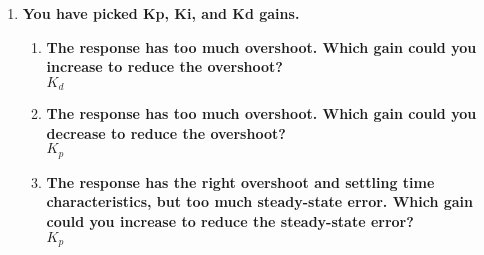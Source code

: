 \documentclass{article}
\begin{document}
\begin{enumerate}[label=\textbf{\arabic*})]
     \item \textbf{You have picked Kp, Ki, and Kd gains. } \\
     
     \begin{enumerate}[label=\textbf{\alph*}.]
        \item \textbf{The response has too much overshoot. Which gain could you increase to reduce the 
        overshoot?} \\

        $K_{d}$

        \item \textbf{The response has too much overshoot. Which gain could you decrease to reduce the 
        overshoot?} \\

        $K_{p}$

        \item \textbf{The response has the right overshoot and settling time characteristics, but too much 
        steady-state error. Which gain could you increase to reduce the steady-state error?} \\

        $K_{p}$
     \end{enumerate}

    
    
\end{enumerate}
\end{document}
